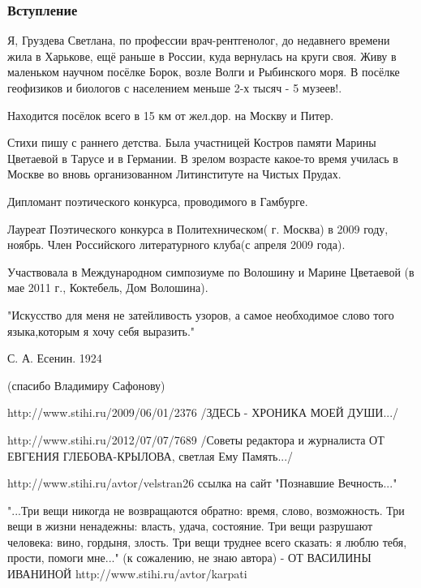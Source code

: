  
 
 

\subsubsection{Вступление}
\label{sec:poetry.rus.svetlana_gruzdeva.intro}


Я, Груздева Светлана, по профессии врач-рентгенолог, до недавнего времени жила
в Харькове, ещё раньше в России, куда вернулась на круги своя. Живу в маленьком
научном посёлке Борок, возле Волги и Рыбинского моря. В посёлке геофизиков и
биологов с населением меньше 2-х тысяч - 5 музеев!.

Находится посёлок всего в 15 км от жел.дор. на Москву и Питер.

Стихи пишу с раннего детства. Была участницей Костров памяти Марины Цветаевой в
Тарусе и в Германии. В зрелом возрасте какое-то время училась в Москве во вновь
организованном Литинституте на Чистых Прудах.  

Дипломант поэтического конкурса, проводимого в Гамбурге.

Лауреат Поэтического конкурса в Политехническом( г. Москва) в 2009 году,
ноябрь.  Член Российского литературного клуба(с апреля 2009 года).

Участвовала в Международном симпозиуме по Волошину и Марине Цветаевой (в мае
2011 г., Коктебель, Дом Волошина).

"Искусство для меня не затейливость узоров, а самое необходимое слово того
языка,которым я хочу себя выразить."

С. А. Есенин. 1924

(спасибо Владимиру Сафонову)

http://www.stihi.ru/2009/06/01/2376
/ЗДЕСЬ - ХРОНИКА МОЕЙ ДУШИ.../

http://www.stihi.ru/2012/07/07/7689
/Советы редактора и журналиста ОТ ЕВГЕНИЯ ГЛЕБОВА-КРЫЛОВА, светлая Ему Память.../

http://www.stihi.ru/avtor/velstran26
ссылка на сайт "Познавшие Вечность..."

"...Три вещи никогда не возвращаются обратно: время, слово, возможность. Три вещи в жизни ненадежны: власть, удача, состояние.
Три вещи разрушают человека: вино, гордыня, злость. Три вещи труднее всего сказать: я люблю тебя, прости, помоги мне..." (к сожалению, не знаю автора) - ОТ ВАСИЛИНЫ ИВАНИНОЙ http://www.stihi.ru/avtor/karpati

